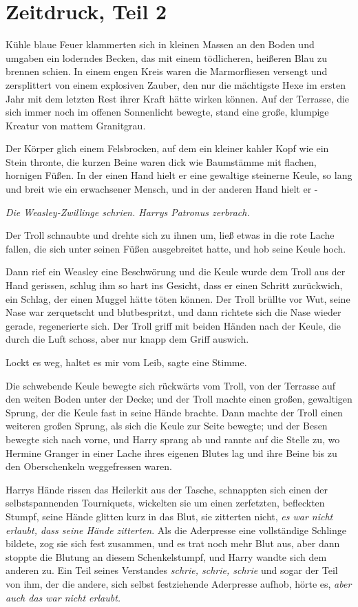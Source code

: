 \chapter{Zeitdruck, Teil 2}

Kühle blaue Feuer klammerten sich in kleinen Massen an den Boden und umgaben ein
loderndes Becken, das mit einem tödlicheren, heißeren Blau zu brennen schien. In
einem engen Kreis waren die Marmorfliesen versengt und zersplittert von einem
explosiven Zauber, den nur die mächtigste Hexe im ersten Jahr mit dem letzten
Rest ihrer Kraft hätte wirken können. Auf der Terrasse, die sich immer noch im
offenen Sonnenlicht bewegte, stand eine große, klumpige Kreatur von mattem
Granitgrau.

Der Körper glich einem Felsbrocken, auf dem ein kleiner kahler Kopf wie ein
Stein thronte, die kurzen Beine waren dick wie Baumstämme mit flachen, hornigen
Füßen. In der einen Hand hielt er eine gewaltige steinerne Keule, so lang und
breit wie ein erwachsener Mensch, und in der anderen Hand hielt er -

\emph{Die Weasley-Zwillinge schrien. Harrys Patronus zerbrach.}

Der Troll schnaubte und drehte sich zu ihnen um, ließ etwas in die rote Lache
fallen, die sich unter seinen Füßen ausgebreitet hatte, und hob seine Keule
hoch.

Dann rief ein Weasley eine Beschwörung und die Keule wurde dem Troll aus der
Hand gerissen, schlug ihm so hart ins Gesicht, dass er einen Schritt zurückwich,
ein Schlag, der einen Muggel hätte töten können. Der Troll brüllte vor Wut,
seine Nase war zerquetscht und blutbespritzt, und dann richtete sich die Nase
wieder gerade, regenerierte sich. Der Troll griff mit beiden Händen nach der
Keule, die durch die Luft schoss, aber nur knapp dem Griff auswich.

\glqq{}Lockt es weg, haltet es mir vom Leib\grqq{}, sagte eine Stimme.

Die schwebende Keule bewegte sich rückwärts vom Troll, von der Terrasse auf den
weiten Boden unter der Decke; und der Troll machte einen großen, gewaltigen
Sprung, der die Keule fast in seine Hände brachte. Dann machte der Troll einen
weiteren großen Sprung, als sich die Keule zur Seite bewegte; und der Besen
bewegte sich nach vorne, und Harry sprang ab und rannte auf die Stelle zu, wo
Hermine Granger in einer Lache ihres eigenen Blutes lag und ihre Beine bis zu
den Oberschenkeln weggefressen waren.

Harrys Hände rissen das Heilerkit aus der Tasche, schnappten sich einen der
selbstspannenden Tourniquets, wickelten sie um einen zerfetzten, befleckten
Stumpf, seine Hände glitten kurz in das Blut, sie zitterten nicht, \emph{es war
nicht erlaubt, dass seine Hände zitterten}. Als die Aderpresse eine vollständige
Schlinge bildete, zog sie sich fest zusammen, und es trat noch mehr Blut aus,
aber dann stoppte die Blutung an diesem Schenkelstumpf, und Harry wandte sich
dem anderen zu. Ein Teil seines Verstandes \emph{schrie, schrie, schrie} und
sogar der Teil von ihm, der die andere, sich selbst festziehende Aderpresse
aufhob, hörte es, \emph{aber auch das war nicht erlaubt.}

